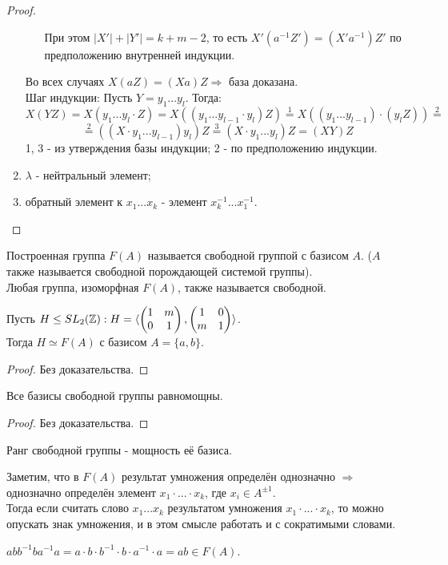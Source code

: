 \begin{proof}
\begin{enumerate}
\begin{itemize}
            При этом $|X'| + |Y'| = k + m - 2$, то есть $X'(a^{-1}Z') = (X'a^{-1})Z'$ по предположению внутренней индукции.
        \end{itemize}
        Во всех случаях $X(aZ) = (Xa)Z \Longrightarrow$ база доказана.\\
        Шаг индукции: Пусть $Y = y_1...y_l$. Тогда:
        \[X(YZ) = X(y_1...y_l\cdot Z) = X((y_1...y_{l-1}\cdot y_l)Z) \overset{1}{=} X((y_1...y_{l-1})\cdot (y_lZ)) \overset{2}{=}\] 
        \[\overset{2}{=} ((X\cdot y_1...y_{l-1}) y_l)Z \overset{3}{=} (X\cdot y_1...y_l)Z = (XY)Z\]
        1, 3 - из утверждения базы индукции; 2 - по предположению индукции.
        \item $\lambda$ - нейтральный элемент;
        \item обратный элемент к $x_1...x_k$ - элемент $x_k^{-1}...x_1^{-1}$.
    \end{enumerate}
\end{proof}
\begin{definition}
    Построенная группа $F(A)$ называется свободной группой с базисом $A$. ($A$ также называется свободной порождающей системой группы).\\
    Любая группа, изоморфная $F(A)$, также называется свободной.
\end{definition}
\begin{subtheorem}
    Пусть $H \leq SL_2(\mathbb{Z}): H = \langle \begin{pmatrix} 1&m\\0&1\end{pmatrix}, \begin{pmatrix} 1&0\\m&1\end{pmatrix} \rangle$.\\
    Тогда $H \simeq F(A)$ с базисом $A = \{a, b\}$.
\end{subtheorem}
\begin{proof}
    Без доказательства.
\end{proof}
\begin{subtheorem}
    Все базисы свободной группы равномощны.
\end{subtheorem}
\begin{proof}
    Без доказательства.
\end{proof}
\begin{definition}
    Ранг свободной группы - мощность её базиса.
\end{definition}
\begin{remark}
    Заметим, что в $F(A)$ результат умножения определён однозначно $\Longrightarrow$ однозначно определён элемент $x_1\cdot ... \cdot x_k$, где $x_i \in A^{\pm 1}$.\\
    Тогда если считать слово $x_1...x_k$ результатом умножения $x_1\cdot ... \cdot x_k$, то можно опускать знак умножения, и в этом смысле работать и с сократимыми словами. 
\end{remark}
\begin{example}
    $abb^{-1}ba^{-1}a = a \cdot b \cdot b^{-1}\cdot b\cdot a^{-1}\cdot a = ab \in F(A)$.
\end{example}